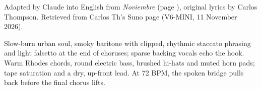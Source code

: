 
\label{sec:it-changes}
\begin{notes}
Adapted by Claude into English from \emph{Noviembre} (page \pageref{sec:noviembre}), original lyrics by Carlos Thompson. Retrieved from Carlos Th's Suno page (V6-MINI, 11 November 2026).
\end{notes}
\begin{style}
Slow-burn urban soul, smoky baritone with clipped, rhythmic staccato phrasing and light falsetto at the end of choruses; sparse backing vocals echo the hook. Warm Rhodes chords, round electric bass, brushed hi-hats and muted horn pads; tape saturation and a dry, up-front lead. At 72 BPM, the spoken bridge pulls back before the final chorus lifts.
\end{style}
